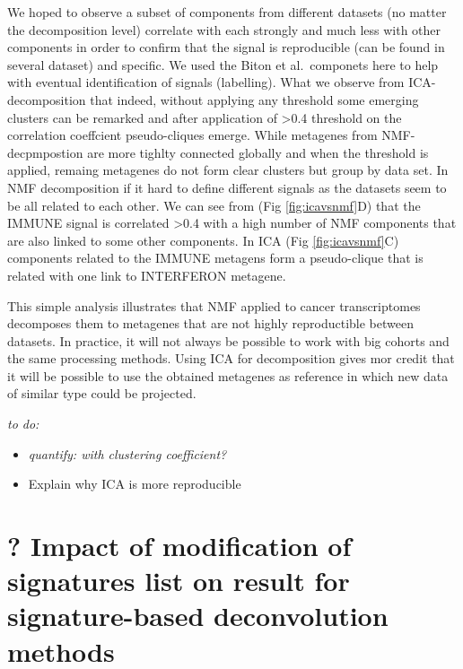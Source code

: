 \documentclass[12pt,]{book}
\theoremstyle{definition}
\theoremstyle{definition}
\theoremstyle{definition}
\theoremstyle{remark}
\begin{document}
We hoped to observe a subset of components from different datasets (no
matter the decomposition level) correlate with each strongly and much
less with other components in order to confirm that the signal is
reproducible (can be found in several dataset) and specific. We used the
Biton et al.~componets here to help with eventual identification of
signals (labelling). What we observe from ICA-decomposition that indeed,
without applying any threshold some emerging clusters can be remarked
and after application of \textgreater{}0.4 threshold on the correlation
coeffcient pseudo-cliques emerge. While metagenes from NMF-decpmpostion
are more tighlty connected globally and when the threshold is applied,
remaing metagenes do not form clear clusters but group by data set. In
NMF decomposition if it hard to define different signals as the datasets
seem to be all related to each other. We can see from (Fig
\ref{fig:icavsnmf}D) that the IMMUNE signal is correlated
\textgreater{}0.4 with a high number of NMF components that are also
linked to some other components. In ICA (Fig \ref{fig:icavsnmf}C)
components related to the IMMUNE metagens form a pseudo-clique that is
related with one link to INTERFERON metagene.

This simple analysis illustrates that NMF applied to cancer
transcriptomes decomposes them to metagenes that are not highly
reproductible between datasets. In practice, it will not always be
possible to work with big cohorts and the same processing methods. Using
ICA for decomposition gives mor credit that it will be possible to use
the obtained metagenes as reference in which new data of similar type
could be projected.

\emph{to do:}

\begin{itemize}
\item
  \emph{quantify: with clustering coefficient?}
\item
  Explain why ICA is more reproducible
\end{itemize}

\hypertarget{impact-of-modification-of-signatures-list-on-result-for-signature-based-deconvolution-methods}{%
\section{? Impact of modification of signatures list on result for
signature-based deconvolution
methods}\label{impact-of-modification-of-signatures-list-on-result-for-signature-based-deconvolution-methods}}
\end{document}
